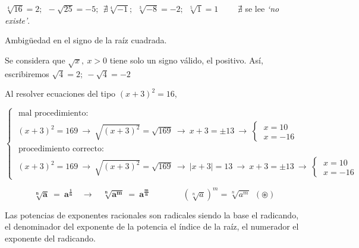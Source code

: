 $\sqrt[4]{16}=2;\ \ -\sqrt{25}=-5 ; \ \ \nexists \sqrt[4]{-1}; \ \ \sqrt[3]{-8}=-2; \ \ \sqrt[5]{1}=1 \qquad $ \textcolor{gris}{$\nexists$ se lee  \emph{`no existe'}}.

\vspace{5mm}
\begin{myalertblock}{Ambigüedad en el signo de la raíz cuadrada.}

Se considera que $\sqrt{x},\ x>0$ tiene solo un signo válido, el positivo. Así, escribiremos $\sqrt{4}=2;\ -\sqrt{4}=-2$

\vspace{2mm} Al resolver ecuaciones del tipo $(x+3)^2=16$,

\vspace{2mm} 
\begin{small}
$\begin{cases}
\text{ mal procedimiento: } \ & \\
\ (x+3)^2=169 \ \to \ \sqrt{(x+3)^2}=\sqrt{169} \ \to \ x+3=\pm 13 \ \to \ \begin{cases} \ x=10 \\ \ x=-16 \end{cases}
\\
\text{ procedimiento correcto: } \ & \\
\ (x+3)^2=169 \ \to \ \sqrt{(x+3)^2}=\sqrt{169} \ \to \ |x+3|=13 \ \to \ x+3=\pm 13  \ \to \ \begin{cases} \ x=10 \\ \ x=-16 \end{cases}
\end{cases}$
\end{small}
	
\end{myalertblock}



\vspace{5mm}\begin{definition}

\begin{large}
$$\boldsymbol{ \sqrt[n]{a} \ = \ a^{\frac 1 n} \quad \longrightarrow \quad \sqrt[n]{a^m}\ = \ a^{\frac m n} } \qquad \qquad (\sqrt[n]{a})^m=\sqrt[n]{a^m} \ \ ( \circledast )$$	\end{large} 

\normalsize{Las} potencias de exponentes racionales son radicales siendo la base el radicando, el denominador del exponente de la potencia el índice de la raíz, el numerador el exponente del radicando.
\end{definition}

